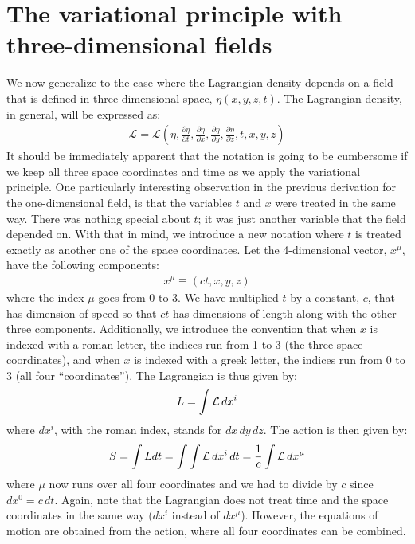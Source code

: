 \section{The variational principle with three-dimensional fields}
We now generalize to the case where the Lagrangian density depends on a field that is defined in three dimensional space, $\eta(x,y,z,t)$. The Lagrangian density, in general, will be expressed as:
\begin{align}
\mathcal{L}=\mathcal{L}(\eta,\frac{\partial\eta}{\partial t},\frac{\partial\eta}{\partial x},\frac{\partial\eta}{\partial y},\frac{\partial\eta}{\partial z},t,x,y,z)
\end{align}
It should be immediately apparent that the notation is going to be cumbersome if we keep all three space coordinates and time as we apply the variational principle. One particularly interesting observation in the previous derivation for the one-dimensional field, is that the variables $t$ and $x$ were treated in the same way. There was nothing special about $t$; it was just another variable that the field depended on. With that in mind, we introduce a new notation where $t$ is treated exactly as another one of the space coordinates. Let the 4-dimensional vector, $x^\mu$, have the following components:
\begin{align}
x^\mu\equiv(ct,x,y,z)
\end{align}
where the index $\mu$ goes from 0 to 3. We have multiplied $t$ by a constant, $c$, that has dimension of speed so that $ct$ has dimensions of length along with the other three components. Additionally, we introduce the convention that when $x$ is indexed with a roman letter, the indices run from 1 to 3 (the three space coordinates), and when $x$ is indexed with a greek letter, the indices run from 0 to 3 (all four ``coordinates''). The Lagrangian is thus given by:
\begin{align}
L=\int \mathcal{L} \,dx^i
\end{align}
where $dx^i$, with the roman index, stands for $dx\,dy\,dz$. The action is then given by:
\begin{align}
S=\int L dt = \int \int \mathcal{L} \,dx^i \,dt =\frac{1}{c} \int \mathcal{L} \,dx^\mu
\end{align}
where $\mu$ now runs over all four coordinates and we had to divide by $c$ since $dx^0=c\,dt$. Again, note that the Lagrangian does not treat time and the space coordinates in the same way ($dx^i$ instead of $dx^\mu$). However, the equations of motion are obtained from the action, where all four coordinates can be combined.

